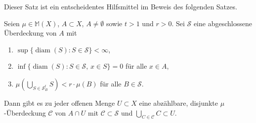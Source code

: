 \documentclass[a4paper,twoside,DIV15,BCOR12mm]{scrbook}
\DeclareMathOperator{\diam}{diam}
\begin{document}
Dieser Satz ist ein entscheidentes Hilfsmittel im Beweis des folgenden Satzes.

\begin{satz}
\label{satz:2.6}
Seien $\mu\in\mathbb M(X)$, $A\subset X$, $A\ne \emptyset$ sowie $t>1$ und $r>0$. Sei $\mathcal S$ eine abgeschlossene Überdeckung von $A$ mit
\begin{enumerate}
\item $\sup\{\diam(S): S\in\mathcal S\}<\infty$,
\item $\inf\{\diam(S): S\in\mathcal S,\, x\in S\}=0$ für alle $x\in A$,
\item $\mu(\bigcup_{S\in\mathcal S_B^t} S) < r\cdot \mu(B)$ für alle $B\in\mathcal S$.
\end{enumerate}
Dann gibt es zu jeder offenen Menge $U\subset X$ eine abzählbare, disjunkte $\mu$-Überdeckung $\mathcal C$ von $A\cap U$ mit $\mathcal C\subset\mathcal S$ und $\bigcup_{C\in\mathcal C}C\subset U$.
\end{satz}
\end{document}
